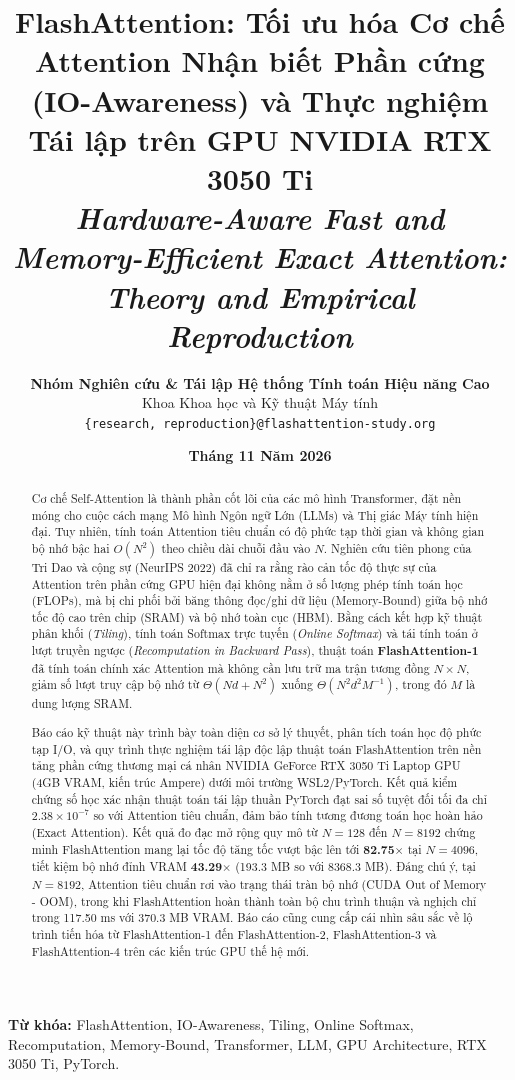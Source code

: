 \documentclass[10pt,a4paper]{article}
\title{\LARGE \textbf{\color{navyblue}FlashAttention: Tối ưu hóa Cơ chế Attention Nhận biết Phần cứng (IO-Awareness) và Thực nghiệm Tái lập trên GPU NVIDIA RTX 3050 Ti}\\[0.4em]
\large \textit{Hardware-Aware Fast and Memory-Efficient Exact Attention: Theory and Empirical Reproduction}}
\author{\textbf{Nhóm Nghiên cứu \& Tái lập Hệ thống Tính toán Hiệu năng Cao}\\
Khoa Khoa học và Kỹ thuật Máy tính\\
\texttt{\{research, reproduction\}@flashattention-study.org}}
\date{\textbf{Tháng 11 Năm 2026}}
\begin{document}
\maketitle

\begin{abstract}
Cơ chế Self-Attention là thành phần cốt lõi của các mô hình Transformer, đặt nền móng cho cuộc cách mạng Mô hình Ngôn ngữ Lớn (LLMs) và Thị giác Máy tính hiện đại. Tuy nhiên, tính toán Attention tiêu chuẩn có độ phức tạp thời gian và không gian bộ nhớ bậc hai $O(N^2)$ theo chiều dài chuỗi đầu vào $N$. Nghiên cứu tiên phong của Tri Dao và cộng sự (NeurIPS 2022) đã chỉ ra rằng rào cản tốc độ thực sự của Attention trên phần cứng GPU hiện đại không nằm ở số lượng phép tính toán học (FLOPs), mà bị chi phối bởi băng thông đọc/ghi dữ liệu (Memory-Bound) giữa bộ nhớ tốc độ cao trên chip (SRAM) và bộ nhớ toàn cục (HBM). Bằng cách kết hợp kỹ thuật phân khối (\textit{Tiling}), tính toán Softmax trực tuyến (\textit{Online Softmax}) và tái tính toán ở lượt truyền ngược (\textit{Recomputation in Backward Pass}), thuật toán \textbf{FlashAttention-1} đã tính toán chính xác Attention mà không cần lưu trữ ma trận tương đồng $N \times N$, giảm số lượt truy cập bộ nhớ từ $\Theta(Nd + N^2)$ xuống $\Theta(N^2 d^2 M^{-1})$, trong đó $M$ là dung lượng SRAM.

Báo cáo kỹ thuật này trình bày toàn diện cơ sở lý thuyết, phân tích toán học độ phức tạp I/O, và quy trình thực nghiệm tái lập độc lập thuật toán FlashAttention trên nền tảng phần cứng thương mại cá nhân NVIDIA GeForce RTX 3050 Ti Laptop GPU (4GB VRAM, kiến trúc Ampere) dưới môi trường WSL2/PyTorch. Kết quả kiểm chứng số học xác nhận thuật toán tái lập thuần PyTorch đạt sai số tuyệt đối tối đa chỉ $2.38 \times 10^{-7}$ so với Attention tiêu chuẩn, đảm bảo tính tương đương toán học hoàn hảo (Exact Attention). Kết quả đo đạc mở rộng quy mô từ $N=128$ đến $N=8192$ chứng minh FlashAttention mang lại tốc độ tăng tốc vượt bậc lên tới \textbf{82.75$\times$} tại $N=4096$, tiết kiệm bộ nhớ đỉnh VRAM \textbf{43.29$\times$} (193.3 MB so với 8368.3 MB). Đáng chú ý, tại $N=8192$, Attention tiêu chuẩn rơi vào trạng thái tràn bộ nhớ (CUDA Out of Memory - OOM), trong khi FlashAttention hoàn thành toàn bộ chu trình thuận và nghịch chỉ trong 117.50 ms với 370.3 MB VRAM. Báo cáo cũng cung cấp cái nhìn sâu sắc về lộ trình tiến hóa từ FlashAttention-1 đến FlashAttention-2, FlashAttention-3 và FlashAttention-4 trên các kiến trúc GPU thế hệ mới.
\end{abstract}

\vspace{0.5em}
\noindent \textbf{Từ khóa:} FlashAttention, IO-Awareness, Tiling, Online Softmax, Recomputation, Memory-Bound, Transformer, LLM, GPU Architecture, RTX 3050 Ti, PyTorch.
\end{document}
